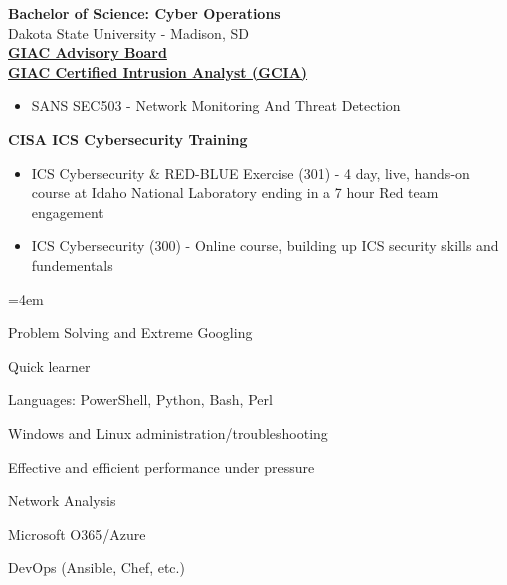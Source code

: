 \documentclass[a4paper,10pt]{article}
\begin{document}
\textbf{Bachelor of Science: Cyber Operations} \\
Dakota State University - Madison, SD \\
\href{https://www.credly.com/badges/a65cec63-e07c-4e52-b154-842564aadf65/public_url}{\textbf{GIAC Advisory Board}} \\
\href{https://www.credly.com/badges/87563fff-910c-449c-ab21-f571b162cd4b/public_url}{\textbf{GIAC Certified Intrusion Analyst (GCIA)}}
\begin{itemize}
    \small
    \leftskip=4em
    \item SANS SEC503 - Network Monitoring And Threat Detection
\end{itemize}
\textbf{CISA ICS Cybersecurity Training}
\begin{itemize}
    \small
    \leftskip=4em
    \item ICS Cybersecurity \& RED-BLUE Exercise (301) - 4 day, live, hands-on course at Idaho National Laboratory ending in a 7 hour Red team engagement 
    \item ICS Cybersecurity (300) - Online course, building up ICS security skills and fundementals
\end{itemize}
\begin{itemize}
    \begin{multicols}{2}
    \small
    \leftskip=4em
    \item Problem Solving and Extreme Googling
    \item Quick learner
    \item Languages: PowerShell, Python, Bash, Perl
    \item Windows and Linux administration/troubleshooting
    \item Effective and efficient performance under pressure
    \item Network Analysis
    \item Microsoft O365/Azure
    \item DevOps (Ansible, Chef, etc.)
    \end{multicols}
\end{itemize}
\end{document}
